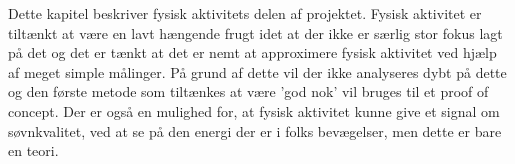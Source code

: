 Dette kapitel beskriver fysisk aktivitets delen af projektet.
Fysisk aktivitet er tiltænkt at være en lavt hængende frugt idet at der ikke er særlig stor fokus lagt på det og det er tænkt at det er nemt at approximere fysisk aktivitet ved hjælp af meget simple målinger.
På grund af dette vil der ikke analyseres dybt på dette og den første metode som tiltænkes at være 'god nok' vil bruges til et proof of concept.
Der er også en mulighed for, at fysisk aktivitet kunne give et signal om søvnkvalitet, ved at se på den energi der er i folks bevægelser, men dette er bare en teori.